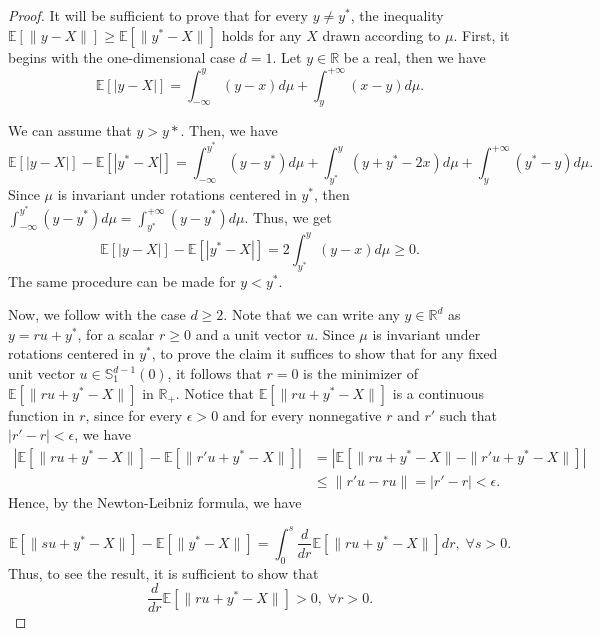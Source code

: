 \documentclass[10pt,a4paper]{amsart}
\newcommand{\E}{\mathbb{E}}
\newcommand{\R}{\mathbb{R}}
\renewcommand{\SS}{\mathbb{S}}
\begin{document}
\begin{proof}
    It will be sufficient to prove that for every $y\neq y^*$, the inequality $\E\left[\|y-X\|\right]\geq \E\left[\|y^*-X\|\right]$ holds for any $X$ drawn according to $\mu$. First, it begins with the one-dimensional case $d=1$. Let $y\in \R$ be a real, then we have
    \begin{equation*}
        \E\left[|y-X|\right]=\int_{-\infty}^y(y-x)d\mu + \int_{y}^{+\infty}(x-y)d\mu.
    \end{equation*}

    We can assume that $y>y*$. Then, we have
    \begin{equation*}
        \E\left[|y-X|\right] - \E\left[|y^*-X|\right] = \int_{-\infty}^{y^*}(y-y^*)d\mu +\int_{y^*}^{y} (y+y^*-2x) d\mu + \int_{y}^{+\infty} (y^*-y) d\mu.
    \end{equation*}
    Since $\mu$ is invariant under rotations centered in $y^*$, then $\int_{-\infty}^{y^*}(y-y^*)d\mu = \int_{y^*}^{+\infty}(y-y^*)d\mu$. Thus, we get
    \begin{equation*}
        \E\left[|y-X|\right] - \E\left[|y^*-X|\right] = 2\int_{y^*}^{y} (y-x) d\mu \geq 0.
    \end{equation*}
    The same procedure can be made for $y<y^*$.

    Now, we follow with the case $d\geq 2$. Note that we can write any $y\in \R^d$ as $y = ru+y^*$, for a scalar $r\geq 0$ and a unit vector $u$. Since $\mu$ is invariant under rotations centered in $y^*$, to prove the claim it suffices to show that for any fixed unit vector $u\in \SS^{d-1}_1(0)$, it follows that $r = 0$ is the minimizer of $\E\left[\|ru+y^*-X\|\right]$ in $\R_+$. Notice that $\E\left[\|ru+y^*-X\|\right]$ is a continuous function in $r$, since for every $\epsilon>0$ and for every nonnegative $r$ and $r'$ such that $|r'-r|<\epsilon$, we have
    \begin{align*}
        \left|\E\left[\|ru+y^*-X\|\right] - \E\left[\|r'u+y^*-X\|\right]\right|&=\left|\E\left[\|ru+y^*-X\|-\|r'u+y^*-X\|\right]\right|\\
        & \leq \|r'u-ru\|=|r'-r|<\epsilon.
    \end{align*}
    Hence, by the Newton-Leibniz formula, we have

    \begin{equation*}
        \E\left[\|su+y^*-X\|\right]-\E\left[\|y^*-X\|\right]=\int_0^s\frac{d}{dr}\E\left[\|ru+y^*-X\|\right]dr, \; \forall s>0.
    \end{equation*}
    Thus, to see the result, it is sufficient to show that
    \begin{equation*}
        \frac{d}{dr}\E\left[\|ru+y^*-X\|\right]>0, \; \forall r>0.
    \end{equation*}
    

\end{proof}
\end{document}
